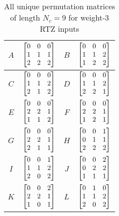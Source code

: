 \documentclass[11pt, oneside, dvipdfmx]{book}
\begin{document}
\begin{table}[h!]
\centering
\begin{tabular}{|c || c  |c  ||c  |} 
 \hline
 $A$ & $\begin{bmatrix} 0 & 0 & 0 \cr 1 & 1 & 1 \cr 2 & 2 & 2\end{bmatrix}$ 
  &
 $B$ & $\begin{bmatrix}0 & 0 & 0 \cr 1 & 1 & 2 \cr 1 & 2 & 2\end{bmatrix}$\\ 
 \hline
$C$ & $\begin{bmatrix}0 & 0 & 0 \cr 1 & 1 & 2 \cr 2 & 1 & 2\end{bmatrix}$ 
 &
$D$ & $\begin{bmatrix}0 & 0 & 0 \cr 1 & 1 & 2 \cr 2 & 2 & 1\end{bmatrix}$\\ 
 \hline
 $E$ & $\begin{bmatrix}0 & 0 & 0 \cr 2 & 2 & 1 \cr 1 & 1 & 2\end{bmatrix}$ 
 &
 $F$ & $\begin{bmatrix}0 & 0 & 0 \cr 2 & 2 & 1 \cr 1 & 2 & 1\end{bmatrix}$\\ 
 \hline
 $G$ & $\begin{bmatrix}0 & 0 & 0 \cr 2 & 2 & 1 \cr 2 & 1 & 1\end{bmatrix}$ 
 &
  $H$ & $\begin{bmatrix}0 & 0 & 1 \cr 0 & 1 & 1 \cr 2 & 2 & 2\end{bmatrix}$\\ 
 \hline
  $I$ & $\begin{bmatrix}0 & 0 & 1 \cr 1 & 1 & 2 \cr 2 & 0 & 2\end{bmatrix}$ 
 &
 $J$ & $\begin{bmatrix}0 & 0 & 2 \cr 0 & 2 & 2 \cr 1 & 1 & 1\end{bmatrix}$\\ 
 \hline
  $K$ & $\begin{bmatrix}0 & 0 & 2 \cr 2 & 2 & 1 \cr 1 & 0 & 1\end{bmatrix}$
 &
  $L$ & $\begin{bmatrix}0 & 1 & 0 \cr 1 & 1 & 2 \cr 2 & 0 & 2\end{bmatrix}$\\ 
 \hline
\end{tabular}
\caption{All unique permutation matrices of length $N_c =9$ for weight-$3$ RTZ inputs}
\label{tb2}
\end{table}
\end{document}
